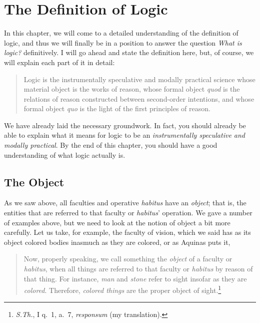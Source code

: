 \documentclass[
  12pt,
]{memoir}
\begin{document}
\chapter{The Definition of Logic}\label{the-definition-of-logic}

In this chapter, we will come to a detailed understanding of the
definition of logic, and thus we will finally be in a position to answer
the question \emph{What is logic?} definitively. I will go ahead and
state the definition here, but, of course, we will explain each part of
it in detail:

\begin{quote}
Logic is the instrumentally speculative and modally practical science
whose material object is the works of reason, whose formal object
\emph{quod} is the relations of reason constructed between second-order
intentions, and whose formal object \emph{quo} is the light of the first
principles of reason.
\end{quote}

We have already laid the necessary groundwork. In fact, you should
already be able to explain what it means for logic to be an
\emph{instrumentally speculative and modally practical}. By the end of
this chapter, you should have a good understanding of what logic
actually is.

\section{The Object}\label{the-object}

As we saw above, all faculties and operative \emph{habitus} have an
\emph{object}; that is, the entities that are referred to that faculty
or \emph{habitus}' operation. We gave a number of examples above, but we
need to look at the notion of object a bit more carefully. Let us take,
for example, the faculty of vision, which we said has as its object
colored bodies inasmuch as they are colored, or as Aquinas puts it,

\begin{quote}
Now, properly speaking, we call something the \emph{object} of a faculty
or \emph{habitus}, when all things are referred to that faculty or
\emph{habitus} by reason of that thing. For instance, \emph{man} and
\emph{stone} refer to sight insofar as they are \emph{colored}.
Therefore, \emph{colored things} are the proper object of
sight.\footnote{\emph{S.Th.}, I q.~1, a.~7, \emph{responsum} (my
  translation).}
\end{quote}
\end{document}
